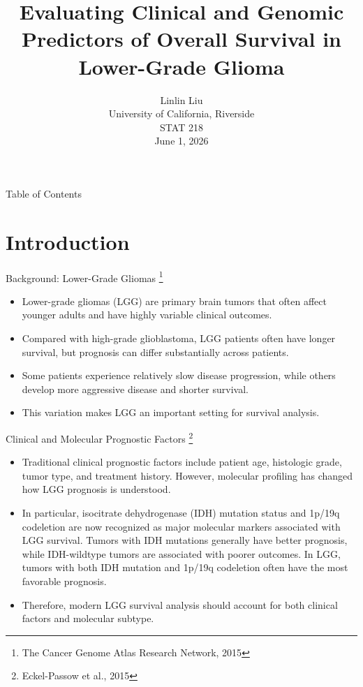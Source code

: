 \documentclass{beamer}
\title[STAT 218]
{Evaluating Clinical and Genomic Predictors of Overall Survival in Lower-Grade Glioma}
\author[L. Liu] 
{Linlin Liu\texorpdfstring{\\}{ }
University of California, Riverside\\
STAT 218 \\
June 1, 2026 \\}
\date[June 1, 2026]
\begin{document}
\begin{frame}
  \titlepage
\end{frame}

\begin{frame}{Table of Contents}
  \tableofcontents
\end{frame}


\section{Introduction}

\begin{frame}{Background: Lower-Grade Gliomas \footnote{The Cancer Genome Atlas Research Network, 2015}}
\begin{itemize}
    \item Lower-grade gliomas (LGG) are primary brain tumors that often affect younger adults and have highly variable clinical outcomes.
    \item Compared with high-grade glioblastoma, LGG patients often have longer survival, but prognosis can differ substantially across patients.
    \item Some patients experience relatively slow disease progression, while others develop more aggressive disease and shorter survival.
    \item This variation makes LGG an important setting for survival analysis. 
\end{itemize}
\end{frame}

\begin{frame}{Clinical and Molecular Prognostic Factors \footnote{Eckel-Passow et al., 2015}}
\begin{itemize}
    \item Traditional clinical prognostic factors include patient age, histologic grade, tumor type, and treatment history. However, molecular profiling has changed how LGG prognosis is understood.
    \item In particular, isocitrate dehydrogenase (IDH) mutation status and 1p/19q codeletion are now recognized as major molecular markers associated with LGG survival. Tumors with IDH mutations generally have better prognosis, while IDH-wildtype tumors are associated with poorer outcomes.  In LGG, tumors with both IDH mutation and 1p/19q codeletion often have the most favorable prognosis.
    \item Therefore, modern LGG survival analysis should account for both clinical factors and molecular subtype.
\end{itemize}
\end{frame}
\end{document}
